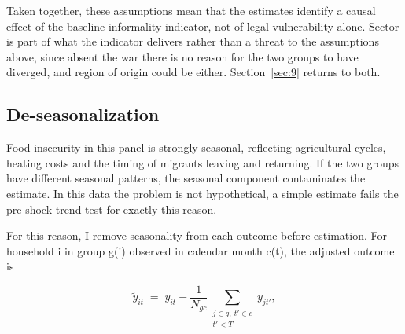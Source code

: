 Taken together, these assumptions mean that the estimates identify a causal effect of the baseline informality indicator, not of legal vulnerability alone. Sector is part of what the indicator delivers rather than a threat to the assumptions above, since absent the war there is no reason for the two groups to have diverged, and region of origin could be either. Section~\ref{sec:9} returns to both.

\subsection{De-seasonalization}\label{sec:6-6}

Food insecurity in this panel is strongly seasonal, reflecting agricultural cycles, heating costs and the timing of migrants leaving and returning. If the two groups have different seasonal patterns, the seasonal component contaminates the estimate. In this data the problem is not hypothetical, a simple estimate fails the pre-shock trend test for exactly this reason.

For this reason, I remove seasonality from each outcome before estimation. For household i in group g(i) observed in calendar month c(t), the adjusted outcome is

\begin{equation}\label{eq:deseason}
\tilde{y}_{it} \;=\; y_{it} - \frac{1}{N_{gc}} \sum_{\substack{j \in g,\ t' \in c \\ t' < T}} y_{jt'},
\end{equation}

